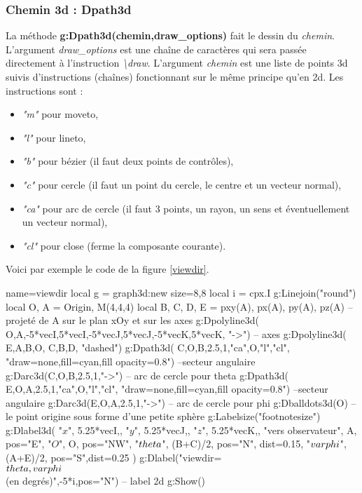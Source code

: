\documentclass[%
10pt,%
a4paper,%
french,%
]%
{article}%
\begin{document}
\subsubsection{Chemin 3d : Dpath3d}

La méthode \textbf{g:Dpath3d(chemin,draw\_options)} fait le dessin du \emph{chemin}. L'argument \emph{draw\_options} est une chaîne de caractères qui sera passée directement à l'instruction \emph{\textbackslash draw}. L'argument \emph{chemin} est une liste de points 3d suivis d'instructions (chaînes) fonctionnant sur le même principe qu'en 2d. Les instructions sont :
    \begin{itemize}
      \item \emph{"m"} pour moveto,
      \item \emph{"l"} pour lineto,
      \item \emph{"b"} pour bézier (il faut deux points de contrôles),
      \item \emph{"c"} pour cercle (il faut un point du cercle, le centre et un vecteur normal),
      \item \emph{"ca"} pour arc de cercle (il faut 3 points, un rayon, un sens et éventuellement un vecteur normal),
      \item \emph{"cl"} pour close (ferme la composante courante).
      \end{itemize}

Voici par exemple le code de la figure \ref{viewdir}.

\begin{Luacode}
\begin{luadraw}{name=viewdir}
local g = graph3d:new{ size={8,8} }
local i = cpx.I
g:Linejoin("round")
local O, A = Origin, M(4,4,4)
local B, C, D, E = pxy(A), px(A), py(A), pz(A) --projeté de A sur le plan xOy et sur les axes
g:Dpolyline3d( {{O,A},{-5*vecI,5*vecI},{-5*vecJ,5*vecJ},{-5*vecK,5*vecK}}, "->") -- axes
g:Dpolyline3d( {{E,A,B,O}, {C,B,D}}, "dashed")
g:Dpath3d( {C,O,B,2.5,1,"ca",O,"l","cl"}, "draw=none,fill=cyan,fill opacity=0.8") --secteur angulaire
g:Darc3d(C,O,B,2.5,1,"->") -- arc de cercle pour theta
g:Dpath3d( {E,O,A,2.5,1,"ca",O,"l","cl"}, "draw=none,fill=cyan,fill opacity=0.8") --secteur angulaire
g:Darc3d(E,O,A,2.5,1,"->") -- arc de cercle pour phi
g:Dballdots3d(O) -- le point origine sous forme d'une petite sphère
g:Labelsize("footnotesize")
g:Dlabel3d(
    "$x$", 5.25*vecI,{}, "$y$", 5.25*vecJ,{}, "$z$", 5.25*vecK,{},
    "vers observateur", A, {pos="E"},
    "$O$", O, {pos="NW"},
    "$\\theta$", (B+C)/2, {pos="N", dist=0.15},
    "$\\varphi$", (A+E)/2, {pos="S",dist=0.25}
)
g:Dlabel("viewdir=\\{$\\theta,\\varphi$\\} (en degrés)",-5*i,{pos="N"}) -- label 2d
g:Show()   
\end{luadraw}      
\end{Luacode}
\end{document}
